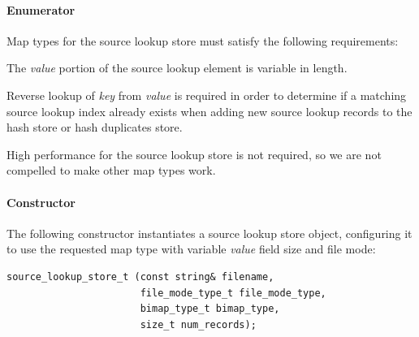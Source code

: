 \documentclass[10pt,twoside]{article}
\begin{document}
\paragraph{Enumerator}
Map types for the source lookup store must satisfy the following requirements:
\begin{compactitem}
\item The \emph{value} portion of the source lookup element is variable in length.
\item Reverse lookup of \emph{key} from \emph{value} is required
in order to determine if a matching source lookup index already exists
when adding new source lookup records to the hash store or hash duplicates store.
\item High performance for the source lookup store is not required,
so we are not compelled to make other map types work.
\end{compactitem}

\paragraph{Constructor}
The following constructor instantiates a source lookup store object,
configuring it to use the requested map type with variable \emph{value} field size and file mode:
\begin{small}
\begin{verbatim}
source_lookup_store_t (const string& filename,
                       file_mode_type_t file_mode_type,
                       bimap_type_t bimap_type,
                       size_t num_records);
\end{verbatim}
\end{small}
\end{document}
